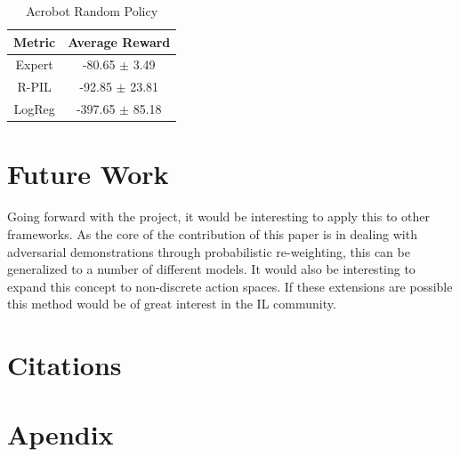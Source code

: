 \documentclass[11pt]{article}
\begin{document}
\begin{table}[H]
\caption{Acrobot Random Policy} %
\centering %
    \begin{tabular}{c c} %
        \hline\hline %
        Metric &  Average Reward \\ [0.5ex] %
        \hline %
        Expert &  -80.65 $\pm$ 3.49
         \\ %
        R-PIL & -92.85 $\pm$ 23.81   \\ %
       LogReg & -397.65 $\pm$ 85.18\\
        \hline %
    \end{tabular}
\label{LunarLanderRandom} %
\end{table}


\section{Future Work}

\quad Going forward with the project, it would be interesting to apply this to other frameworks. As the core of the contribution of this paper is in dealing with adversarial demonstrations through probabilistic re-weighting, this can be generalized to a number of different models. It would also be interesting to expand this concept to non-discrete action spaces. If these extensions are possible this method would be of great interest in the IL community.



\section{Citations}
 
\printbibliography 

\section{Apendix}
\end{document}
